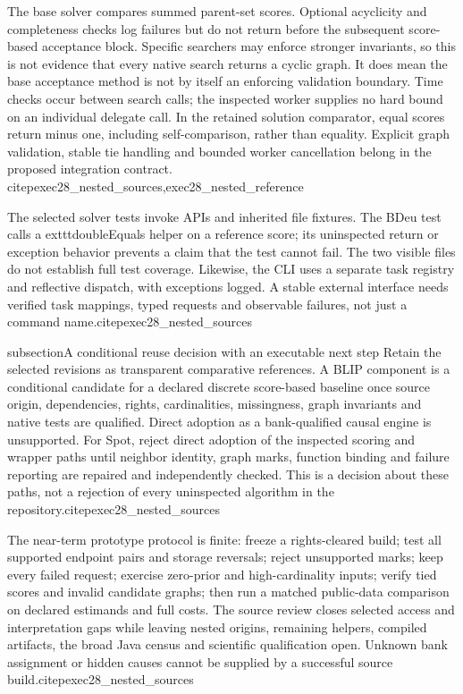 The base solver compares summed parent-set scores. Optional acyclicity and
completeness checks log failures but do not return before the subsequent
score-based acceptance block. Specific searchers may enforce stronger
invariants, so this is not evidence that every native search returns a cyclic
graph. It does mean the base acceptance method is not by itself an enforcing
validation boundary. Time checks occur between search calls; the inspected
worker supplies no hard bound on an individual delegate call. In the retained
solution comparator, equal scores return minus one, including self-comparison,
rather than equality. Explicit graph validation, stable tie handling and
bounded worker cancellation belong in the proposed integration contract.
citep{exec28_nested_sources,exec28_nested_reference}

The selected solver tests invoke APIs and inherited file fixtures. The BDeu
test calls a 	exttt{doubleEquals} helper on a reference score; its uninspected
return or exception behavior prevents a claim that the test cannot fail. The
two visible files do not establish full test coverage. Likewise, the CLI uses
a separate task registry and reflective dispatch, with exceptions logged. A
stable external interface needs verified task mappings, typed requests and
observable failures, not just a command name.citep{exec28_nested_sources}

subsection{A conditional reuse decision with an executable next step}
Retain the selected revisions as transparent comparative references. A BLIP
component is a conditional candidate for a declared discrete score-based
baseline once source origin, dependencies, rights, cardinalities, missingness,
graph invariants and native tests are qualified. Direct adoption as a
bank-qualified causal engine is unsupported. For Spot, reject direct adoption
of the inspected scoring and wrapper paths until neighbor identity, graph
marks, function binding and failure reporting are repaired and independently
checked. This is a decision about these paths, not a rejection of every
uninspected algorithm in the repository.citep{exec28_nested_sources}

The near-term prototype protocol is finite: freeze a rights-cleared build;
test all supported endpoint pairs and storage reversals; reject unsupported
marks; keep every failed request; exercise zero-prior and high-cardinality
inputs; verify tied scores and invalid candidate graphs; then run a matched
public-data comparison on declared estimands and full costs. The source
review closes selected access and interpretation gaps while leaving nested
origins, remaining helpers, compiled artifacts, the broad Java census and
scientific qualification open. Unknown bank assignment or hidden causes
cannot be supplied by a successful source build.citep{exec28_nested_sources}
